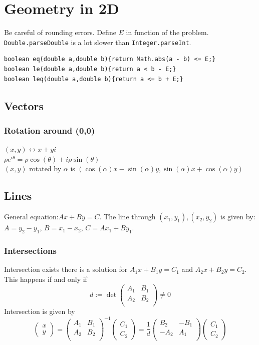\section{Geometry in 2D}
Be careful of rounding errors. Define $E$ in function of the problem.
\lstinline|Double.parseDouble| is a lot slower than \lstinline|Integer.parseInt|.
\begin{lstlisting}
boolean eq(double a,double b){return Math.abs(a - b) <= E;}
boolean le(double a,double b){return a < b - E;}
boolean leq(double a,double b){return a <= b + E;}
\end{lstlisting}
\subsection{Vectors}
\subsubsection{Rotation around (0,0)}
$(x, y) \leftrightarrow x + y i$\\
$\rho e^{i\theta} = \rho \cos(\theta) + i \rho \sin(\theta)$\\

$(x, y)$ rotated by $\alpha$ is
$(\cos(\alpha) x - \sin(\alpha) y, \sin(\alpha)  x + \cos(\alpha) y)$


\subsection{Lines}
General equation:$Ax + By = C$. The line through $(x_1, y_1), (x_2, y_2)$ is given by: $A = y_2 - y_1$, $B = x_1 - x_2$, $C = A x_1 + B y_1$.
\subsubsection{Intersections}
Intersection exists there is a solution for $A_1 x + B_1 y = C_1$ and $A_2 x + B_2 y = C_2$. This happens if and only if $$d := \det \begin{pmatrix}
A_1 & B_1 \\
A_2 & B_2 \\
\end{pmatrix} \neq 0$$
Intersection is given by
$$\begin{pmatrix}
x\\
y
\end{pmatrix} =
\begin{pmatrix}
A_1 & B_1 \\
A_2 & B_2 \\
\end{pmatrix}^{-1}
\begin{pmatrix}
C_1 \\
C_2
\end{pmatrix}
=
\frac{1}{d}
\begin{pmatrix}
B_2 & -B_1 \\
-A_2 & A_1 \\
\end{pmatrix}
\begin{pmatrix}
C_1 \\
C_2
\end{pmatrix}
$$
